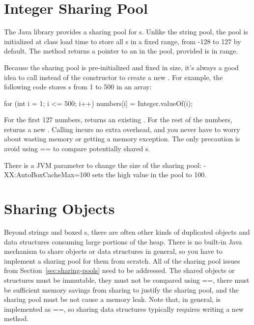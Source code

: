 \section{Integer Sharing Pool}

The Java library provides a sharing pool for s. 
Unlike the string pool, the  pool is initialized at class load
time to store all s in a fixed range, from -128 to 127 by
default. The method  returns a pointer to an  
in the pool, provided  is in range.

Because the  sharing pool is pre-initialized and fixed in size,
it's always a good idea to call  instead of the constructor to
create a new . For example, the following code stores
s from 1 to 500 in an array:
\begin{shortlisting}
    for (int i = 1; i <= 500; i++) {
        numbers[i] = Integer.valueOf(i);
    }
\end{shortlisting}
For the first 127 numbers,  returns an existing . 
For the rest of the numbers,  returns a new
.  Calling  incurs no extra overhead,
and you never have to worry about wasting memory or getting a
memory exception. The only precaution is avoid using == to compare potentially
shared s.

There is a JVM parameter to change the size of the  sharing pool:
-XX:AutoBoxCacheMax=100 sets the high value in the pool to 100.

\section{Sharing Objects}

Beyond strings and boxed s, there are often other kinds of
duplicated objects and data structures consuming large portions of the heap. 
There is no built-in Java mechanism to share objects or data
structures in general, so you have to implement a sharing pool for them from
scratch. All of the sharing pool issues from Section~\ref{sec:sharing-pools} need to be
addressed. The shared objects or structures must be immutable, they must not be
compared using ==, there must be sufficient memory savings from sharing to
justify the sharing pool, and the sharing pool must be not cause a memory leak. 
Note that, in general,  is
implemented as ==, so sharing data structures typically requires writing a new
 method.


